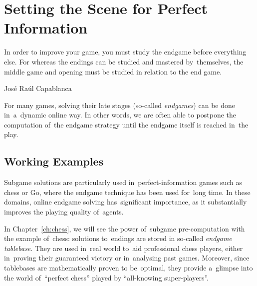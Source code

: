 \chapter{Setting the Scene for Perfect Information}
\epigraph{
  In order to improve your game, you must study the endgame before everything else.
  For whereas the endings can be studied and mastered by~themselves, the middle game and opening must be studied in relation to the end game.
}{José Raúl Capablanca}

For many games, solving their late stages (so-called \emph{endgames}) can be done in~a~dynamic online way.
In other words, we are often able to postpone the computation of~the endgame strategy until the endgame itself is reached in~the play.

\section{Working Examples}
Subgame solutions are particularly used in~perfect-information games such as chess or Go, where the endgame technique has been used for~long time.
In these domains, online endgame solving has~significant importance, as it substantially improves the playing quality of~agents.

In Chapter~\ref{ch:chess}, we will see the power of~subgame pre-computation with the example of~chess:
solutions to~endings are stored in so-called \emph{endgame tablebase}.
They are used in~real world to~aid professional chess players, either in~proving their guaranteed victory or in~analysing past games.
Moreover, since tablebases are mathematically proven to be~optimal, they provide a~glimpse into the world of~``perfect chess'' played by ``all-knowing super-players''.
